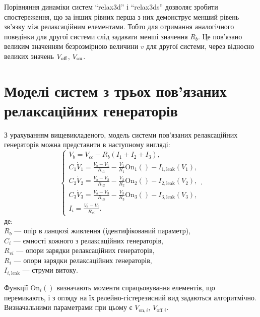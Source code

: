 Порівняння динаміки систем ``relax3d'' і ``relax3ds'' дозволяє зробити
спостереження, що за інших рівних перша з них демонструє менший
рівень зв'язку між релаксаційним елементами. Тобто для отримання
аналогічного поведінки для другої системи слід задавати менші
значення
$R_b $. Це пов'язано великим значенням безрозмірною величини
$v $ для другої системи, через відносно великих значень
$V _\mathrm{off} $,
$V _\mathrm{on} $.


\section{Моделі систем з трьох пов'язаних релаксаційних генераторів}

З урахуванням вищевикладеного, модель системи пов'язаних
релаксаційних генераторів можна представити в наступному
вигляді:
%
\begin{equation}
  \begin{cases}
    V_b = V_{cc} - R_b ( I_1 + I_2 + I_3 ), \\
      C_1 \dot{V}_1 = \frac{V_b-V_1}{R_{v1}} - \frac{V_1}{R_1} \mathrm{On}_1() - I_{1,\mathrm{leak}}(V_1), \\
      C_2 \dot{V}_2 = \frac{V_b-V_2}{R_{v2}} - \frac{V_2}{R_2} \mathrm{On}_2() - I_{2,\mathrm{leak}}(V_2), \\
      C_3 \dot{V}_3 = \frac{V_b-V_3}{R_{v3}} - \frac{V_3}{R_3} \mathrm{On}_3() - I_{3,\mathrm{leak}}(V_3), \\
      I_i = \frac{V_b-V_i}{R_{vi}}.
  \end{cases}.
    \label{atu:eq:relax3}
\end{equation}
%
де: \\
$R_b $ --- опір в ланцюзі живлення (ідентифікований параметр), \\
$C_i $ --- ємності кожного з релаксаційних генераторів, \\
$R_{vi} $ --- опори зарядки релаксаційних генераторів, \\
$R_{ i} $ --- опори зарядки релаксаційних генераторів, \\
$I_{i, \mathrm{leak}} $ --- струми витоку.


Функції
$\mathrm{On}_i() $ визначають моменти спрацьовування  елементів, що перемикають,
і з огляду на їх релейно-гістерезисний вид
задаються алгоритмічно. Визначальними параметрами при цьому є
$V_{\mathrm{on}, i} $,
$V_{\mathrm{off}, i} $.

